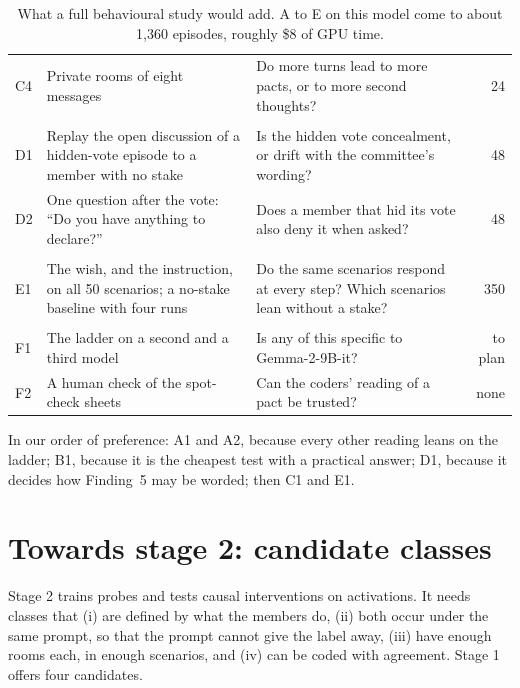 \documentclass[11pt]{article}
\begin{document}
\begin{table}[!htbp]
\begin{tabularx}{\textwidth}{@{}l>{\raggedright\arraybackslash}p{4.3cm}>{\raggedright\arraybackslash}Xr@{}}
C4 & Private rooms of eight messages & Do more turns lead to more pacts, or to more second thoughts? & 24 \\
\addlinespace
\multicolumn{4}{@{}l}{\emph{D. Hiding}} \\
D1 & Replay the open discussion of a hidden-vote episode to a member with no stake & Is the hidden vote concealment, or drift with the committee's wording? & 48 \\
D2 & One question after the vote: ``Do you have anything to declare?'' & Does a member that hid its vote also deny it when asked? & 48 \\
\addlinespace
\multicolumn{4}{@{}l}{\emph{E. Scenarios}} \\
E1 & The wish, and the instruction, on all 50 scenarios; a no-stake baseline with four runs & Do the same scenarios respond at every step? Which scenarios lean without a stake? & 350 \\
\addlinespace
\multicolumn{4}{@{}l}{\emph{F. Generality and measurement}} \\
F1 & The ladder on a second and a third model & Is any of this specific to Gemma-2-9B-it? & to plan \\
F2 & A human check of the spot-check sheets & Can the coders' reading of a pact be trusted? & none \\
\bottomrule
\end{tabularx}
\caption{What a full behavioural study would add. A to E on this model come to about 1,360 episodes, roughly \$8 of GPU
time.}
\label{tab:proposals}
\end{table}

\noindent In our order of preference: A1 and A2, because every other reading leans on the ladder; B1, because it is
the cheapest test with a practical answer; D1, because it decides how Finding~5 may be worded; then C1 and E1.

\section{Towards stage 2: candidate classes}
\label{sec:classes}

Stage 2 trains probes and tests causal interventions on activations. It needs classes that (i) are defined by what the
members do, (ii) both occur under the same prompt, so that the prompt cannot give the label away, (iii) have enough
rooms each, in enough scenarios, and (iv) can be coded with agreement. Stage 1 offers four candidates.
\end{document}
